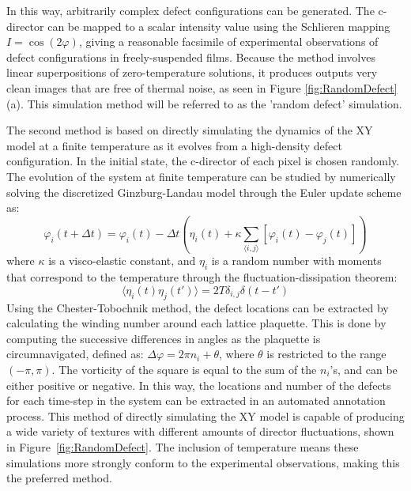 \documentclass[prl,reprint,showpacs,floatfix,nofootinbib]{revtex4-1}
\begin{document}
In this way, arbitrarily complex defect configurations can be generated. The c-director can be mapped to a scalar intensity value using the Schlieren mapping $I = \cos(2\varphi)$, giving a reasonable facsimile of experimental observations of defect configurations in freely-suspended films. Because the method involves linear superpositions of zero-temperature solutions, it produces outputs very clean images that are free of thermal noise, as seen in Figure \ref{fig:RandomDefect} (a). 
 This simulation method will be referred to as the 'random defect' simulation.

The second method is based on directly simulating the dynamics of the XY model at a finite temperature as it evolves from a high-density defect configuration\cite{loft_numerical_1987, yurke_coarsening_1993, jelic_quench_2011}. In the initial state, the c-director of each pixel is chosen randomly. The evolution of the system at finite temperature can be studied by numerically solving the discretized Ginzburg-Landau model through the Euler update scheme as:
\begin{equation}
    \varphi_i(t+\Delta t) = \varphi_i(t) -\Delta t \left( \eta_i(t) + \kappa \sum_{\langle i,j \rangle} \left[\varphi_i(t) - \varphi_j(t) \right] \right)
\end{equation}
where $\kappa$ is a visco-elastic constant, and $\eta_i$ is a random number with moments that correspond to the temperature through the fluctuation-dissipation theorem:
\begin{equation}
    \langle \eta_i(t) \eta_j(t') \rangle  = 2 T \delta_{i,j} \delta(t-t')
\end{equation}
Using the Chester-Tobochnik method\cite{tobochnik_monte_1979}, the defect locations can be extracted by calculating the winding number around each lattice plaquette. This is done by computing the successive differences in angles as the plaquette is circumnavigated, defined as: $\Delta \varphi = 2 \pi n_i+ \theta$, where $\theta$ is restricted to the range $(-\pi,\pi)$. The vorticity of the square is equal to the sum of the $n_i$'s, and can be either positive or negative. In this way, the locations and number of the defects for each time-step in the system can be extracted in an automated annotation process. This method of directly simulating the XY model is capable of producing a wide variety of textures with different amounts of director fluctuations, shown in Figure~\ref{fig:RandomDefect}. The inclusion of temperature means these simulations more strongly conform to the experimental observations, making this the preferred method.
\end{document}
